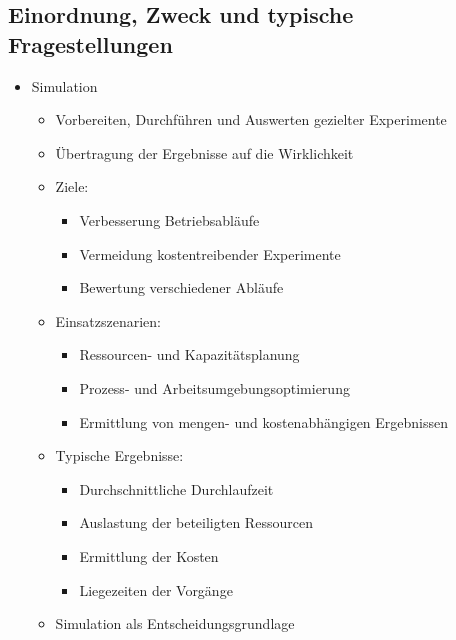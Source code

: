\documentclass[11pt,a4paper]{article}
\begin{document}
\subsection{Einordnung, Zweck und typische Fragestellungen}
\begin{itemize}
\item Simulation
	\begin{itemize}
	\item Vorbereiten, Durchführen und Auswerten gezielter Experimente
	\item Übertragung der Ergebnisse auf die Wirklichkeit
	\item Ziele:
		\begin{itemize}
		\item Verbesserung Betriebsabläufe
		\item Vermeidung kostentreibender Experimente
		\item Bewertung verschiedener Abläufe
		\end{itemize}
	\item Einsatzszenarien: 
		\begin{itemize}
		\item Ressourcen- und Kapazitätsplanung
		\item Prozess- und Arbeitsumgebungsoptimierung
		\item  Ermittlung von mengen- und kostenabhängigen Ergebnissen
		\end{itemize}
	\item Typische Ergebnisse:
		\begin{itemize}
		\item Durchschnittliche Durchlaufzeit
		\item Auslastung der beteiligten Ressourcen 
		\item Ermittlung der Kosten
		\item Liegezeiten der Vorgänge
		\end{itemize}
	\item Simulation als Entscheidungsgrundlage
	\end{itemize}
\end{itemize}
\end{document}
